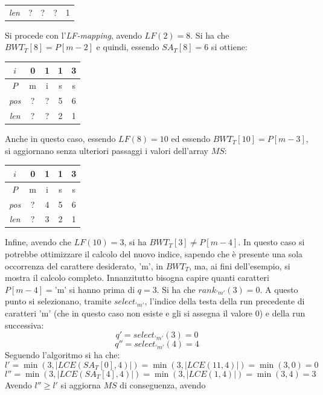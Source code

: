 \begin{esempio}
\begin{table}[H]
\begin{tabular}{c||c|c|c|c}
      \textit{len} & ? & ? & ? & 1\\
    \end{tabular}
  \end{table}
  Si procede con l'\textit{LF-mapping}, avendo $LF(2)=8$. Si ha che
  $BWT_T[8]=P[m-2]$ e quindi, essendo $SA_T[8]=6$ si ottiene:
  \begin{table}[H]
    \centering
    \begin{tabular}{c||c|c|c|c}
      $i$ & 0 & 1 & 1 & 3 \\
      \hline
      $P$ & m & i & s & s \\
      \hline
      \hline
      \textit{pos} & ? & ? & 5 & 6\\
      \hline
      \textit{len} & ? & ? & 2 & 1\\
    \end{tabular}
  \end{table}
  Anche in questo caso, essendo $LF(8)=10$ ed essendo $BWT_T[10]=P[m-3]$, si
  aggiornano senza ulteriori passaggi i valori dell'array $MS$:
  \begin{table}[H]
    \centering
    \begin{tabular}{c||c|c|c|c}
      $i$ & 0 & 1 & 1 & 3 \\
      \hline
      $P$ & m & i & s & s \\
      \hline
      \hline
      \textit{pos} & ? & 4 & 5 & 6\\
      \hline
      \textit{len} & ? & 3 & 2 & 1\\
    \end{tabular}
  \end{table}
  Infine, avendo che $LF(10)=3$, si ha $BWT_T[3]\neq P[m-4]$. In questo caso si
  potrebbe ottimizzare il calcolo del nuovo indice, sapendo che è presente una
  sola occorrenza del carattere desiderato, $\mbox{'m'}$, in $BWT_T$, ma, ai
  fini dell'esempio, si mostra il calcolo completo. Innanzitutto bisogna capire
  quanti caratteri $P[m-4]=\mbox{'m'}$ si hanno prima di $q=3$. Si ha che
  $rank_{'m'}(3)=0$. A questo punto si selezionano, tramite $select_{'m'}$,
  l'indice della
  testa della run precedente di caratteri $\mbox{'m'}$ (che in questo caso non
  esiste e gli si assegna il valore 0) e della run successiva:
  \[q'=select_{'m'}(3)=0\]
  \[q''=select_{'m'}(4)=4\]
  Seguendo l'algoritmo si ha che:
  \[l'=\min(3,\left|LCE(SA_T[0],4)\right|)=\min(3,\left|LCE(11,4)\right|)
    =\min(3,0)=0\]
  \[l''=\min(3,\left|LCE(SA_T[4],4)\right|)=\min(3,\left|LCE(1,4)\right|)
    =\min(3,4)=3\]
  Avendo $l''\geq l'$ si aggiorna $MS$ di conseguenza, avendo

\end{esempio}
